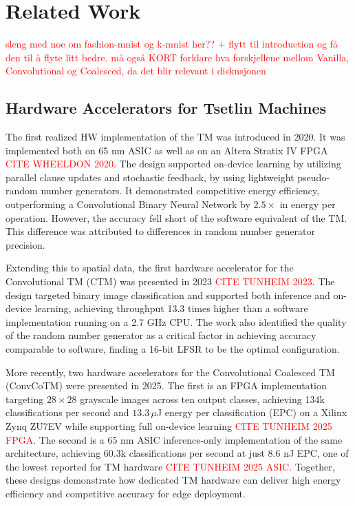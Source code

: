 \section{Related Work}  
\label{sec:related_work}

\textcolor{red}{sleng med noe om fashion-mnist og k-mnist her?? + flytt til introduction og få den til å flyte litt bedre. må også KORT forklare hva forskjellene mellom Vanilla, Convolutional og Coalesced, da det blir relevant i diskusjonen}

\subsection{Hardware Accelerators for Tsetlin Machines}
\label{sec:related_hw}

The first realized HW implementation of the TM was introduced in 2020. It was implemented both on 65 nm ASIC as well as on an Altera Stratix IV FPGA \textcolor{red}{CITE WHEELDON 2020}. The design supported on-device learning by utilizing parallel clause updates and stochastic feedback, by using lightweight pseudo-random number generators. It demonstrated competitive energy efficiency, outperforming a Convolutional Binary Neural Network by $2.5\times$ in energy per operation. However, the accuracy fell short of the software equivalent of the TM. This difference was attributed to differences in random number generator precision.

Extending this to spatial data, the first hardware accelerator for the Convolutional TM (CTM) was presented in 2023 \textcolor{red}{CITE TUNHEIM 2023}. The design targeted binary image classification and supported both inference and on-device learning, achieving throughput 13.3 times higher than a software implementation running on a 2.7 GHz CPU. The work also identified the quality of the random number generator as a critical factor in achieving accuracy comparable to software, finding a 16-bit LFSR to be the optimal configuration. 

More recently, two hardware accelerators for the Convolutional Coalesced TM (ConvCoTM) were presented in 2025. The first is an FPGA implementation targeting $28 \times 28$ grayscale images across ten output classes, achieving 134k classifications per second and $13.3\,\mu$J energy per classification (EPC) on a Xilinx Zynq ZU7EV while supporting full on-device learning \textcolor{red}{CITE TUNHEIM 2025 FPGA}. The second is a 65 nm ASIC inference-only implementation of the same architecture, achieving 60.3k classifications per second at just 8.6 nJ EPC, one of the lowest reported for TM hardware \textcolor{red}{CITE TUNHEIM 2025 ASIC}. Together, these designs demonstrate how dedicated TM hardware can deliver high energy efficiency and competitive accuracy for edge deployment. 

